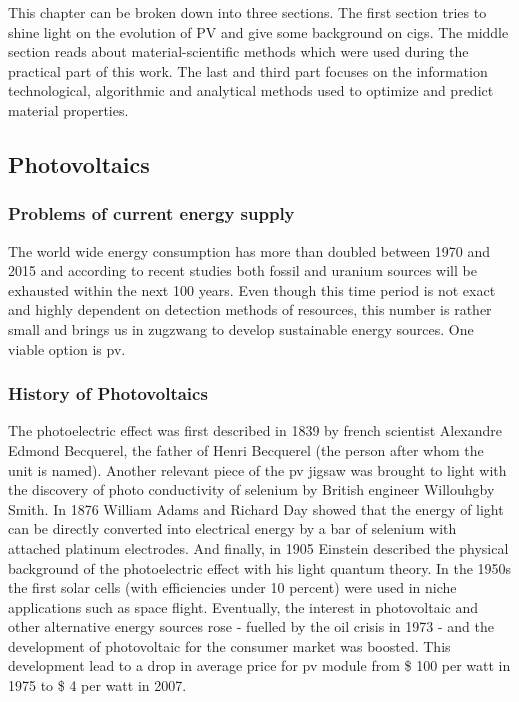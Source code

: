 This chapter can be broken down into three sections. 
The first section tries to shine light on the evolution of PV and give some background on \gls{cigs}.
The middle section reads about material-scientific methods which were used during the practical part of this work. 
The last and third part focuses on the information technological, algorithmic and analytical methods used to optimize and predict material properties. 

\subsection{Photovoltaics}
\subsubsection{Problems of current energy supply}
The world wide energy consumption has more than doubled between 1970 and 2015\cite{BP2017} 
and according to recent studies both fossil\cite{BGR2017} and uranium sources\cite{Uran2006} 
will be exhausted within the next 100 years. 
Even though this time period is not exact and highly dependent on detection methods of resources, 
this number is rather small and brings us in zugzwang to develop sustainable energy sources. 
One viable option is \gls{pv}.

\subsubsection{History of Photovoltaics}
The photoelectric effect was first described in 1839 by french scientist Alexandre 
Edmond Becquerel\cite{becquerel1839memoire}, the father of Henri Becquerel (the person after whom the unit is named).
Another relevant piece of the \gls{pv} jigsaw was brought to light
with the discovery of photo conductivity of selenium
by British engineer Willouhgby Smith\cite{Smith1873Selenium}.
In 1876 William Adams and Richard Day\cite{Adams1876Selenium} showed that 
the energy of light can be directly converted into electrical energy by a bar of 
selenium with attached platinum electrodes.
And finally, in 1905 Einstein described the physical background of the photoelectric 
effect with his light quantum theory\cite{einstein1905erzeugung}.
In the 1950s the first solar cells (with efficiencies under 10 percent) were used in niche applications such as space flight. 
Eventually, the interest in photovoltaic and other alternative energy sources 
rose - fuelled by the oil crisis in 1973 - 
and the development of photovoltaic for the consumer market was boosted. 
This development lead to a drop in 
average price for \gls{pv} module from \$ 100 per watt in 1975 to \$ 4 per watt in 2007\cite{pagliaro2008flexible}.

